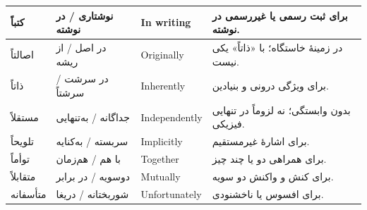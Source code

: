 \begin{longtable}{|p{2.5cm}|p{4.0cm}|p{2.3cm}|p{5.3cm}|}
\hline
کتباً & نوشتاری / در نوشته & \textenglish{In writing} & برای ثبت رسمی یا غیررسمی در نوشته. \\
\hline
اصالتاً & در اصل / از ریشه & \textenglish{Originally} & در زمینهٔ خاستگاه؛ با «ذاتاً» یکی نیست. \\
\hline
ذاتاً & در سرشت / سرشتاً & \textenglish{Inherently} & برای ویژگی درونی و بنیادین. \\
\hline
مستقلاً & جداگانه / به‌تنهایی & \textenglish{Independently} & بدون وابستگی؛ نه لزوماً در تنهایی فیزیکی. \\
\hline
تلویحاً & سربسته / به‌کنایه & \textenglish{Implicitly} & برای اشارهٔ غیرمستقیم. \\
\hline
توأماً & با هم / هم‌زمان & \textenglish{Together} & برای همراهی دو یا چند چیز. \\
\hline
متقابلاً & دوسویه / در برابر & \textenglish{Mutually} & برای کنش و واکنش دو سویه. \\
\hline
متأسفانه & شوربختانه / دریغا & \textenglish{Unfortunately} & برای افسوس یا ناخشنودی. \\
\hline
\end{longtable}
\endgroup


